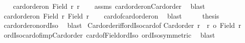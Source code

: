 \begin{isabellebody}
%
\isatagproof
{}\isamarkupfalse%
{\isacharminus}{\kern0pt}\isanewline
\ \ \isamarkupfalse%
\ {\isachardoublequoteopen}card{\isacharunderscore}{\kern0pt}order{\isacharunderscore}{\kern0pt}on\ {\isacharparenleft}{\kern0pt}Field\ r{\isacharparenright}{\kern0pt}\ r{\isachardoublequoteclose}\isanewline
\ \ \isamarkupfalse%
\ assms\ card{\isacharunderscore}{\kern0pt}order{\isacharunderscore}{\kern0pt}on{\isacharunderscore}{\kern0pt}Card{\isacharunderscore}{\kern0pt}order\ \isamarkupfalse%
\ blast\isanewline
\ \ \isamarkupfalse%
\ \isamarkupfalse%
\ {\isachardoublequoteopen}card{\isacharunderscore}{\kern0pt}order{\isacharunderscore}{\kern0pt}on\ {\isacharparenleft}{\kern0pt}Field\ r{\isacharparenright}{\kern0pt}\ {\isacharbar}{\kern0pt}Field\ r{\isacharbar}{\kern0pt}{\isachardoublequoteclose}\isanewline
\ \ \isamarkupfalse%
\ card{\isacharunderscore}{\kern0pt}of{\isacharunderscore}{\kern0pt}card{\isacharunderscore}{\kern0pt}order{\isacharunderscore}{\kern0pt}on\ \isamarkupfalse%
\ blast\isanewline
\ \ \isamarkupfalse%
\ \isamarkupfalse%
\ {\isacharquery}{\kern0pt}thesis\ \isamarkupfalse%
\ card{\isacharunderscore}{\kern0pt}order{\isacharunderscore}{\kern0pt}on{\isacharunderscore}{\kern0pt}ordIso\ \isamarkupfalse%
\ blast\isanewline
{}\isamarkupfalse%
%
\endisatagproof
{\isafoldproof}%
%
\isadelimproof
\isanewline
%
\endisadelimproof
\isanewline
{}\isamarkupfalse%
\ Card{\isacharunderscore}{\kern0pt}order{\isacharunderscore}{\kern0pt}iff{\isacharunderscore}{\kern0pt}ordIso{\isacharunderscore}{\kern0pt}card{\isacharunderscore}{\kern0pt}of{\isacharcolon}{\kern0pt}\isanewline
{\isachardoublequoteopen}Card{\isacharunderscore}{\kern0pt}order\ r\ {\isacharequal}{\kern0pt}\ {\isacharparenleft}{\kern0pt}r\ {\isacharequal}{\kern0pt}o\ {\isacharbar}{\kern0pt}Field\ r{\isacharbar}{\kern0pt}\ {\isacharparenright}{\kern0pt}{\isachardoublequoteclose}\isanewline
%
\isadelimproof
%
\endisadelimproof
%
\isatagproof
{}\isamarkupfalse%
\ ordIso{\isacharunderscore}{\kern0pt}card{\isacharunderscore}{\kern0pt}of{\isacharunderscore}{\kern0pt}imp{\isacharunderscore}{\kern0pt}Card{\isacharunderscore}{\kern0pt}order\ card{\isacharunderscore}{\kern0pt}of{\isacharunderscore}{\kern0pt}Field{\isacharunderscore}{\kern0pt}ordIso\ ordIso{\isacharunderscore}{\kern0pt}symmetric\ \isamarkupfalse%
\ blast%
\endisatagproof
{\isafoldproof}%

\end{isabellebody}
